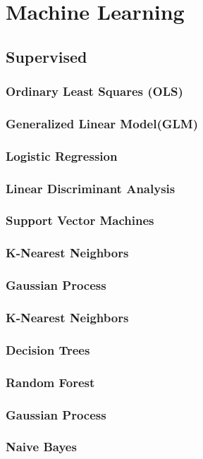 \documentclass[11pt]{article}
\begin{document}
\section{Machine Learning}
\subsection{Supervised}
\subsubsection{Ordinary Least Squares (OLS)}
\subsubsection{Generalized Linear Model(GLM)}
\subsubsection{Logistic Regression}
\subsubsection{Linear Discriminant Analysis}
\subsubsection{Support Vector Machines}
\subsubsection{K-Nearest Neighbors}
\subsubsection{Gaussian Process}
\subsubsection{K-Nearest Neighbors}
\subsubsection{Decision Trees}
\subsubsection{Random Forest}
\subsubsection{Gaussian Process}
\subsubsection{Naive Bayes}
\end{document}
